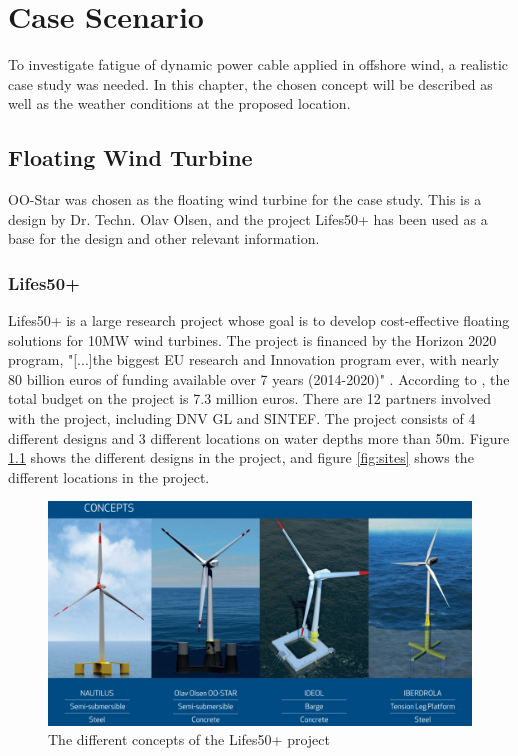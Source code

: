 \chapter{Case Scenario}
To investigate fatigue of dynamic power cable applied in offshore wind, a realistic case study was needed. In this chapter, the chosen concept will be described as well as the weather conditions at the proposed location.  
\section{Floating Wind Turbine}
OO-Star was chosen as the floating wind turbine for the case study. This is a design by Dr. Techn. Olav Olsen, and the project Lifes50+ has been used as a base for the design and other relevant information. 
\subsection{Lifes50+}
Lifes50+ is a large research project whose goal is to develop cost-effective floating solutions for 10MW wind turbines. The project is financed by the Horizon 2020 program, "[...]the biggest EU research and Innovation program ever, with nearly 80 billion euros of funding available over 7 years (2014-2020)" \cite{Horizon2010}. According to \cite{Olavolsen}, the total budget on the project is 7.3 million euros. There are 12 partners involved with the project, including DNV GL and SINTEF. The project consists of 4 different designs and 3 different locations on water depths more than 50m. Figure \ref{fig:concept} shows the different designs in the project, and figure \ref{fig:sites} shows the different locations in the project. 

\begin{figure}[H]
\centering
\includegraphics[scale=0.4]{figures/concepts}
\caption[$\; \:$Concepts of the Lifes50+ project]{The different concepts of the Lifes50+ project \cite{Lifes50+} }
 \label{fig:concept}
\end{figure}

